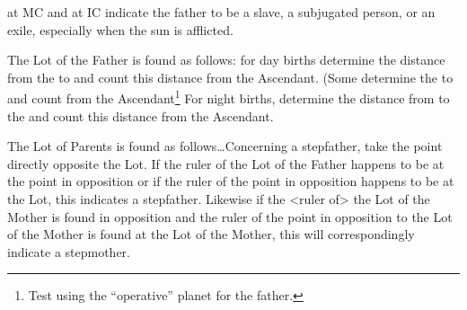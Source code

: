 \Saturn\xspace at MC and \Jupiter\xspace at IC indicate the
father to be a slave, a subjugated person, or an exile, especially when the sun is afflicted.

The Lot of the Father is found as follows: for day births determine the distance from the \Sun\xspace to \Saturn\xspace and count this distance from the Ascendant. (Some determine the \Sun\xspace to \Jupiter\xspace and count from the Ascendant\footnote{Test using the ``operative'' planet for the father.} For night births, determine the distance from \Venus\xspace to the \Moon\xspace and count this distance from the Ascendant. 

The Lot of Parents is found as follows\ldots Concerning a stepfather, take the point directly opposite the Lot. If the ruler of the Lot of the Father happens to be at the point in opposition or if the ruler of the point in opposition happens to be at the Lot, this indicates a stepfather. Likewise if the <ruler of> the Lot of the Mother is found in opposition and the ruler of the point in opposition to the Lot of the Mother is found at the Lot of the Mother, this will
correspondingly indicate a stepmother.

\newpage